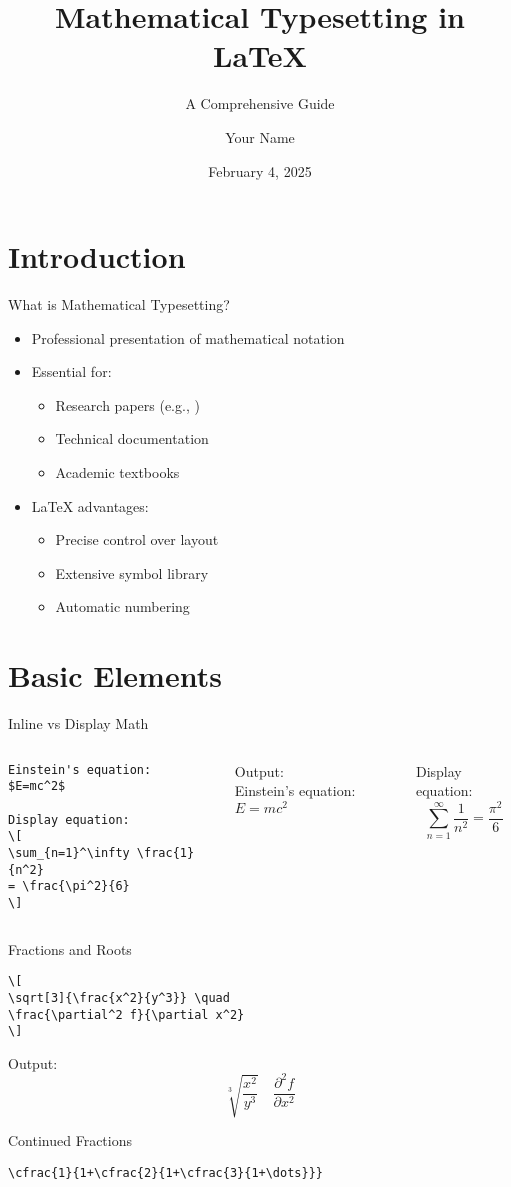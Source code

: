 \documentclass{beamer}
\title{Mathematical Typesetting in LaTeX}
\subtitle{A Comprehensive Guide}
\author{Your Name}
\institute{Your Institution}
\date{February 4, 2025}
\begin{document}
\begin{frame}
\titlepage
\end{frame}

\section{Introduction}
\begin{frame}{What is Mathematical Typesetting?}
\begin{itemize}
\item Professional presentation of mathematical notation
\item Essential for:
\begin{itemize}
\item Research papers (e.g., \cite{einstein})
\item Technical documentation
\item Academic textbooks
\end{itemize}
\item LaTeX advantages:
\begin{itemize}
\item Precise control over layout
\item Extensive symbol library
\item Automatic numbering
\end{itemize}
\end{itemize}
\end{frame}

\section{Basic Elements}
\begin{frame}[fragile]{Inline vs Display Math}
\begin{columns}
\begin{lstlisting}
Einstein's equation: $E=mc^2$

Display equation:
\[
\sum_{n=1}^\infty \frac{1}{n^2} 
= \frac{\pi^2}{6}
\]
\end{lstlisting}

Output:\\
Einstein's equation: \( E=mc^2 \)

Display equation:
\[
\sum_{n=1}^\infty \frac{1}{n^2} = \frac{\pi^2}{6}
\]
\end{columns}
\end{frame}

\begin{frame}[fragile]{Fractions and Roots}
\begin{lstlisting}
\[
\sqrt[3]{\frac{x^2}{y^3}} \quad
\frac{\partial^2 f}{\partial x^2}
\]
\end{lstlisting}

Output:
\[
\sqrt[3]{\frac{x^2}{y^3}} \quad \frac{\partial^2 f}{\partial x^2}
\]

\begin{block}{Continued Fractions}
\begin{lstlisting}
\cfrac{1}{1+\cfrac{2}{1+\cfrac{3}{1+\dots}}}
\end{lstlisting}
\end{block}
\end{frame}
\end{document}
